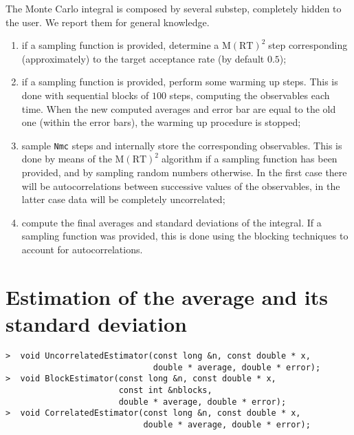 \documentclass[11pt,a4paper,twoside]{article}
\newcommand{\MRTWO}{$ \text{M}(\text{RT})^2 \;$}
\begin{document}
The Monte Carlo integral is composed by several substep, completely hidden to the user.
We report them for general knowledge.
\begin{enumerate}
\item if a sampling function is provided, determine a \MRTWO step corresponding (approximately) to the target acceptance rate (by default $0.5$);
\item if a sampling function is provided, perform some warming up steps. This is done with sequential blocks of $100$ steps, computing the observables each time. When the new computed averages and error bar are equal to the old one (within the error bars), the warming up procedure is stopped;
\item sample \verb+Nmc+ steps and internally store the corresponding observables. This is done by means of the \MRTWO algorithm if a sampling function has been provided, and by sampling random numbers otherwise. In the first case there will be autocorrelations between successive values of the observables, in the latter case data will be completely uncorrelated;
\item compute the final averages and standard deviations of the integral. If a sampling function was provided, this is done using the blocking techniques to account for autocorrelations.
\end{enumerate}





\section{Estimation of the average and its standard deviation} %
\label{sec:mean_estimation_and_standard_deviation}

\begin{verbatim}
>  void UncorrelatedEstimator(const long &n, const double * x,
                              double * average, double * error);
>  void BlockEstimator(const long &n, const double * x,
                       const int &nblocks,
                       double * average, double * error);
>  void CorrelatedEstimator(const long &n, const double * x,
                            double * average, double * error);
\end{verbatim}
\end{document}
